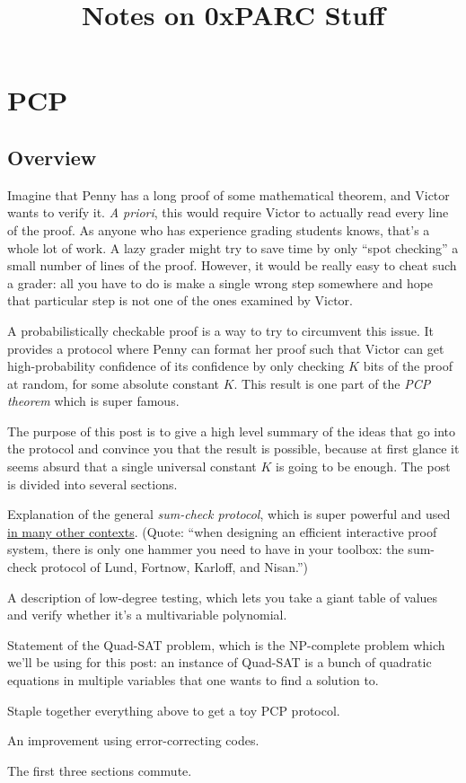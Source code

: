 \documentclass[11pt]{scrreprt}
\begin{document}
\title{Notes on 0xPARC Stuff}

\maketitle

\chapter{PCP}
\section{Overview}
Imagine that Penny has a long proof of some mathematical theorem, and Victor wants to verify it.
\emph{A priori}, this would require Victor to actually read every line of the proof.
As anyone who has experience grading students knows, that's a whole lot of work.
A lazy grader might try to save time by only ``spot checking''
a small number of lines of the proof.
However, it would be really easy to cheat such a grader:
all you have to do is make a single wrong step somewhere
and hope that particular step is not one of the ones examined by Victor.

A probabilistically checkable proof is a way to try to circumvent this issue.
It provides a protocol where Penny can format her proof such that
Victor can get high-probability confidence of its confidence
by only checking $K$ bits of the proof at random, for some absolute constant $K$.
This result is one part of the \emph{PCP theorem} which is super famous.

The purpose of this post is to give a high level summary of the ideas that go into the
protocol and convince you that the result is possible, because at first glance it seems
absurd that a single universal constant $K$ is going to be enough.
The post is divided into several sections.
\begin{itemize}
  \ii Explanation of the general \emph{sum-check protocol},
  which is super powerful and used
  \href{https://zkproof.org/2020/03/16/sum-checkprotocol/}{in many other contexts}.
  (Quote: ``when designing an efficient interactive proof system,
  there is only one hammer you need to have in your toolbox:
  the sum-check protocol of Lund, Fortnow, Karloff, and Nisan.'')

  \ii A description of low-degree testing, which lets you take a
  giant table of values and verify whether it's a multivariable polynomial.

  \ii Statement of the Quad-SAT problem,
  which is the NP-complete problem which we'll be using for this post:
  an instance of Quad-SAT is a bunch of quadratic equations in multiple variables
  that one wants to find a solution to.

  \ii Staple together everything above to get a toy PCP protocol.

  \ii An improvement using error-correcting codes.
\end{itemize}
The first three sections commute.
\end{document}
